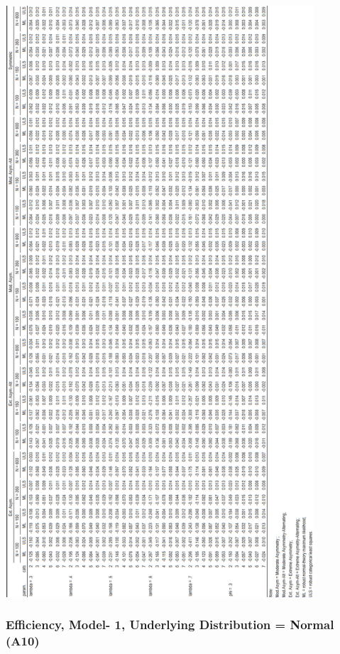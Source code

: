 \documentclass[10,a4paperpaper,]{article}
\begin{document}
\includegraphics[width=325pt]{./figures/tabA9}

\subsubsection{Efficiency, Model- 1, Underlying Distribution = Normal (A10)}
\end{document}
